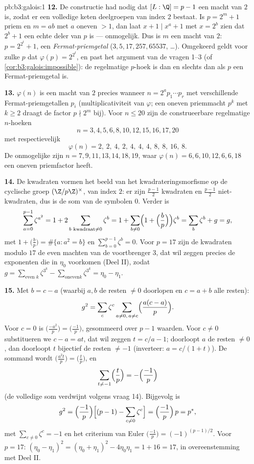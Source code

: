 \begin{solution}{pb:b3:galois:1}
\textbf{12.} De constructie had nodig dat $[L:\Q] = p - 1$ een
macht van $2$ is, zodat er een volledige keten deelgroepen van
index $2$ bestaat. Is $p = 2^m + 1$ priem en $m = ab$ met $a$
oneven $> 1$, dan laat $x + 1 \mid x^a + 1$ met $x = 2^b$ zien dat
$2^b + 1$ een echte deler van $p$ is --- onmogelijk. Dus is $m$
een macht van $2$: $p = 2^{2^t} + 1$, een
\emph{Fermat-priemgetal} ($3, 5, 17, 257, 65537$, \dots).
Omgekeerd geldt voor zulke $p$ dat $\varphi(p) = 2^{2^t}$, en past
het argument van de vragen 1--3 (of
\cref{cor:b3:galois:impossible}): de regelmatige $p$-hoek is
 dan en slechts dan als $p$ een Fermat-priemgetal
is.

\textbf{13.} $\varphi(n)$ is een macht van $2$ precies wanneer $n
= 2^a p_1\cdots p_r$ met verschillende Fermat-priemgetallen $p_i$
(multiplicativiteit van $\varphi$; een oneven priemmacht $p^k$ met
$k \geq 2$ draagt de factor $p \nmid 2^m$ bij). Voor $n \leq 20$
zijn de construeerbare regelmatige $n$-hoeken
\[
n = 3, 4, 5, 6, 8, 10, 12, 15, 16, 17, 20
\]
met respectievelijk
\[
\varphi(n) = 2,\ 2,\ 4,\ 2,\ 4,\ 4,\ 4,\ 8,\ 8,\ 16,\ 8 .
\]
De onmogelijke zijn $n = 7, 9, 11, 13, 14, 18, 19$, waar
$\varphi(n) = 6, 6, 10, 12, 6, 6, 18$ een oneven priemfactor
heeft.

\textbf{14.} De kwadraten vormen het beeld van het
kwadrateringsmorfisme op de cyclische groep $(\Z/p\Z)^\times$, van
index $2$: er zijn $\frac{p-1}2$ kwadraten en $\frac{p-1}2$
niet-kwadraten, dus is de som van de symbolen $0$. Verder is
\[
\sum_{a=0}^{p-1}\zeta^{a^2} = 1 + 2\sum_{b \text{ kwadraat}
\neq 0}\zeta^b
= 1 + \sum_{b\neq0}\Bigl(1 + \Bigl(\frac bp\Bigr)\Bigr)
\zeta^b = \sum_{b}\zeta^b + g = g,
\]
met $1 + \bigl(\frac bp\bigr) = \#\{a : a^2 = b\}$ en
$\sum_{b=0}^{p-1}\zeta^b = 0$. Voor $p = 17$ zijn de kwadraten
modulo $17$ de even machten van de voortbrenger $3$, dat wil
zeggen precies de exponenten die in $\eta_0$ voorkomen (Deel II),
zodat $g = \sum_{\text{even }k}\zeta^{3^k} - \sum_{\text{oneven
}k} \zeta^{3^k} = \eta_0 - \eta_1$.

\textbf{15.} Met $b = c - a$ (waarbij $a, b$ de resten $\neq 0$
doorlopen en $c = a + b$ alle resten):
\[
g^2 = \sum_c\zeta^c\sum_{a\neq0,\,a\neq c}
\Bigl(\frac{a(c-a)}p\Bigr) .
\]
Voor $c = 0$ is $\bigl(\frac{-a^2}p\bigr) =
\bigl(\frac{-1}p\bigr)$, gesommeerd over $p - 1$ waarden. Voor $c
\neq 0$ substitueren we $c - a = at$, dat wil zeggen $t = c/a -
1$; doorloopt $a$ de resten $\neq 0$, dan doorloopt $t$ bijectief
de resten $\neq -1$ (inverteer: $a = c/(1 + t)$). De sommand wordt
$\bigl(\frac{a^2t}p\bigr) = \bigl(\frac tp\bigr)$, en
\[
\sum_{t \neq -1}\Bigl(\frac tp\Bigr)
= -\Bigl(\frac{-1}p\Bigr)
\]
(de volledige som verdwijnt volgens vraag 14). Bijgevolg is
\[
g^2 = \Bigl(\frac{-1}p\Bigr)\Bigl[(p-1) -
\sum_{c\neq0}\zeta^c\Bigr]
= \Bigl(\frac{-1}p\Bigr)\,p = p^* ,
\]
met $\sum_{c\neq0}\zeta^c = -1$ en het criterium van Euler
$\bigl(\frac{-1}p\bigr) = (-1)^{(p-1)/2}$. Voor $p = 17$:
$(\eta_0 - \eta_1)^2 = (\eta_0 + \eta_1)^2 - 4\eta_0\eta_1 = 1 +
16 = 17$, in overeenstemming met Deel II.


\end{solution}
